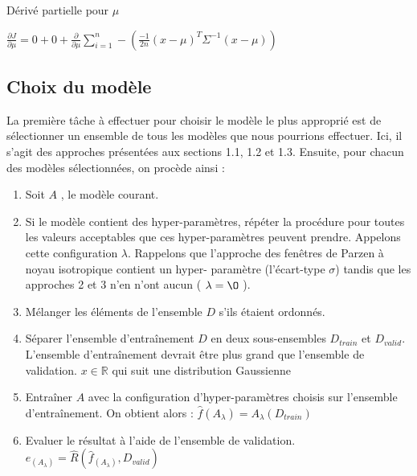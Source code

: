 \documentclass[a4paper,10pt]{article}
\begin{document}
Dérivé partielle pour $\mu$

$\frac{\partial J}{\partial \mu} = 0 + 0 + \frac{\partial }{\partial \mu} \sum_{i=1}^{n}  - (\frac{-1}{2n} (x- \mu)^{T} \Sigma^{-1} (x- \mu) )$ 

\subsection{Choix du modèle}

La première tâche à effectuer pour choisir le modèle le plus approprié est de sélectionner un ensemble de tous les modèles que nous pourrions effectuer. Ici, il s'agit des approches présentées aux sections 1.1, 1.2 et 1.3. Ensuite, pour chacun des modèles sélectionnées, on procède ainsi :

\begin{enumerate}
	\item Soit $A$ , le modèle courant.
	\item Si le modèle contient des hyper-paramètres, répéter la procédure pour toutes les valeurs acceptables que ces hyper-paramètres peuvent prendre. Appelons cette configuration $\lambda$. Rappelons que l'approche des fenêtres de Parzen à noyau isotropique contient un hyper- paramètre (l'écart-type $\sigma$) tandis que les approches 2 et 3 n'en n'ont aucun ( $\lambda= \O$ ).
	\item Mélanger les éléments de l'ensemble $D$ s'ils étaient ordonnés.
	\item Séparer l'ensemble d'entraînement $D$ en deux sous-ensembles $D_{train}$ et $D_{valid}$. L'ensemble d’entraînement devrait être plus grand que l'ensemble de validation. $x \in \mathds{R}$ qui suit une distribution Gaussienne
	\item Entraîner $A$ avec la configuration d'hyper-paramètres choisis sur l'ensemble d'entraînement. On obtient alors : $\widehat{f} (A_{\lambda})=A_{\lambda}(D_{train})$
	\item Evaluer le résultat à l'aide de l'ensemble de validation. $e_{(A_{\lambda})} = \widehat{R} ( \widehat{f}_{(A_{\lambda})} , D_{valid} )$
\end{enumerate}
\end{document}
